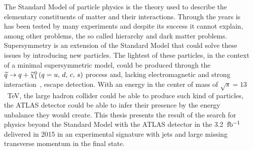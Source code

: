 The Standard Model of particle physics is the theory used to describe the
elementary constituents of matter and their interactions. Through the years is
has been tested by many experiments and despite its success it cannot explain,
among other problems, the so called hierarchy and dark matter
problems. Supersymmetry is an extension of the Standard Model that could solve
these issues by introducing new particles. The lightest of these particles, in
the context of a minimal supersymmetric model, could be produced through the
$\widetilde{q} \rightarrow q + \widetilde{\chi}_1^0\, (q = u,\, d,\, c,\, s)$ process and, lacking electromagnetic and strong
interaction~\cite{MSSMIntro}, escape detection. With an energy in the center of
mass of $\sqrt{s} = 13$~TeV, the large hadron collider could be able to produce
such kind of particles, the ATLAS detector could be able to infer their presence
by the energy unbalance they would create. This thesis presents the result of
the search for physics beyond the Standard Model with the ATLAS detector in the
3.2~$\mbox{fb$^{-1}$}$ delivered in 2015 in an experimental signature with jets and large
missing transverse momentum in the final state.
